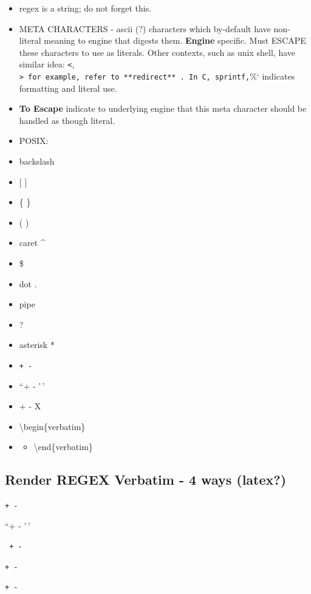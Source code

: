 \documentclass[
]{report}
\providecommand{\tightlist}{%
  \setlength{\itemsep}{0pt}\setlength{\parskip}{0pt}}\usepackage{longtable,booktabs,array}
\begin{document}
\begin{itemize}
\item
  regex is a string; do not forget this.
\item
  META CHARACTERS - ascii (?) characters which by-default have
  non-literal meaning to engine that digests them. \textbf{Engine}
  specific. Must ESCAPE these characters to use as literals. Other
  contexts, such as unix shell, have similar idea: \texttt{\textless{}},
  \texttt{\textgreater{}\textquotesingle{}\ for\ example,\ refer\ to\ **redirect**\ .\ In\ C,\ sprintf,}\%`
  indicates formatting and literal use.
\item
  \textbf{To Escape} indicate to underlying engine that this meta
  character should be handled as though literal.
\item
  POSIX:
\item
  backslash\\
\item
  {[} {]}
\item
  \{ \}
\item
  ( )
\item
  caret \^{}
\item
  \$
\item
  dot .
\item
  pipe \textbar{}
\item
  ?
\item
  asterisk *
\item
  \texttt{+\ -}
\item
  ``+ - '\,'
\item
  \verbX + - X
\item
  \textbackslash begin\{verbatim\}
\item
  \begin{itemize}
  \tightlist
  \item
    \textbackslash end\{verbatim\}
  \end{itemize}
\end{itemize}

\subsection{Render REGEX Verbatim - 4 ways
(latex?)}\label{render-regex-verbatim---4-ways-latex}

\texttt{+\ -}

``+ - '\,'

\verb; + - ;

\verb;+ -;

\begin{verbatim} 
+ - 
\end{verbatim}
\end{document}
